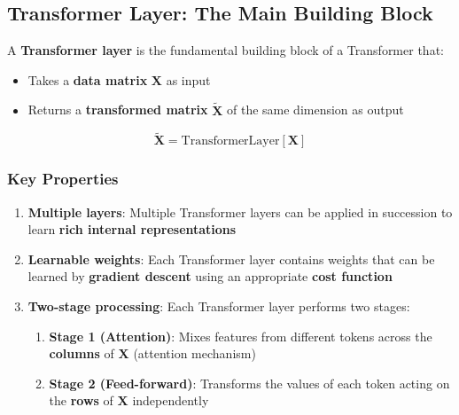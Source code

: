 \documentclass[11pt,a4paper]{article}
\theoremstyle{definition}
\theoremstyle{plain}
\theoremstyle{remark}
\begin{document}
\begin{center}
\end{center}

\subsection{Transformer Layer: The Main Building Block}

\begin{tcolorbox}[colback=blue!10!white,colframe=blue!75!black,title=\textbf{Transformer Layer}]
A \textbf{Transformer layer} is the fundamental building block of a Transformer that:
\begin{itemize}
    \item Takes a \textbf{data matrix} $\mathbf{X}$ as input
    \item Returns a \textbf{transformed matrix} $\tilde{\mathbf{X}}$ of the same dimension as output
\end{itemize}

\[
\tilde{\mathbf{X}} = \text{TransformerLayer}[\mathbf{X}]
\]
\end{tcolorbox}

\subsubsection{Key Properties}

\begin{enumerate}
    \item \textbf{Multiple layers}: Multiple Transformer layers can be applied in succession to learn \textbf{rich internal representations}
    
    \item \textbf{Learnable weights}: Each Transformer layer contains weights that can be learned by \textbf{gradient descent} using an appropriate \textbf{cost function}
    
    \item \textbf{Two-stage processing}: Each Transformer layer performs two stages:
    \begin{enumerate}
        \item \textbf{Stage 1 (Attention)}: Mixes features from different tokens across the \textbf{columns} of $\mathbf{X}$ (attention mechanism)
        \item \textbf{Stage 2 (Feed-forward)}: Transforms the values of each token acting on the \textbf{rows} of $\mathbf{X}$ independently
    \end{enumerate}
\end{enumerate}
\end{document}
